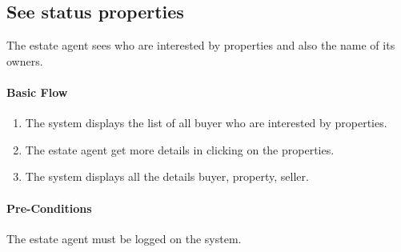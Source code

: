 \documentclass[a4paper,12pt]{article}
\begin{document}
\subsection{See status properties}
The estate agent sees who are interested by properties and also the name of its owners.
\paragraph{Basic Flow}
\begin{enumerate}
\item The system displays the list of all buyer who are interested by properties.
\item The estate agent get more details in clicking on the properties.
\item The system displays all the details buyer, property, seller.
\end{enumerate}
\paragraph{Pre-Conditions}
The estate agent must be logged on the system.
\end{document}
